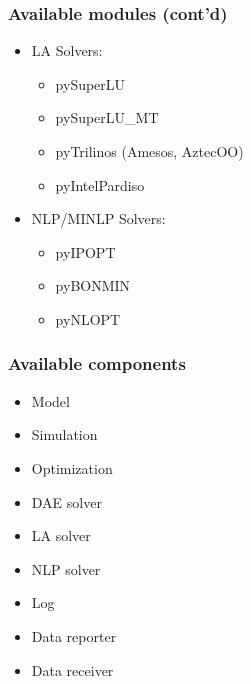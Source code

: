 \documentclass[compress,newPxFont,sthlmFooter]{beamer}
\begin{document}
\begin{frame}
\frametitle{Available modules (cont'd)}
\begin{block}{}
\begin{itemize}
  \item LA Solvers: 
  \begin{itemize}
    \item pySuperLU
    \item pySuperLU\_MT
    \item pyTrilinos (Amesos, AztecOO)
    \item pyIntelPardiso
  \end{itemize}
\end{itemize}
\end{block}
\begin{block}{}
\begin{itemize}
  \item NLP/MINLP Solvers: 
  \begin{itemize}
    \item pyIPOPT
    \item pyBONMIN
    \item pyNLOPT
  \end{itemize}
\end{itemize}
\end{block}
\end{frame}

\begin{frame}
\frametitle{Available components}
\begin{block}{}
\begin{itemize}
  \item Model
  \item Simulation
  \item Optimization
  \item DAE solver
  \item LA solver
  \item NLP solver
  \item Log
  \item Data reporter
  \item Data receiver
\end{itemize}
\end{block}
\end{frame}
\end{document}
